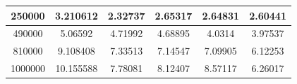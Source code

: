 \begin{longtable}[c]{|c|ccccc|}
	250000                                                                                   & \multicolumn{1}{c|}{3.210612}                                                                                      & \multicolumn{1}{c|}{2.32737}             & \multicolumn{1}{c|}{2.65317}             & \multicolumn{1}{c|}{2.64831}              & 2.60441               \\ \hline
	490000                                                                                   & \multicolumn{1}{c|}{5.06592}                                                                                       & \multicolumn{1}{c|}{4.71992}             & \multicolumn{1}{c|}{4.68895}             & \multicolumn{1}{c|}{4.0314}               & 3.97537               \\ \hline
	810000                                                                                   & \multicolumn{1}{c|}{9.108408}                                                                                      & \multicolumn{1}{c|}{7.33513}             & \multicolumn{1}{c|}{7.14547}             & \multicolumn{1}{c|}{7.09905}              & 6.12253               \\ \hline
	1000000                                                                                  & \multicolumn{1}{c|}{10.155588}                                                                                     & \multicolumn{1}{c|}{7.78081}             & \multicolumn{1}{c|}{8.12407}             & \multicolumn{1}{c|}{8.57117}              & 6.26017               \\ \hline
\end{longtable}